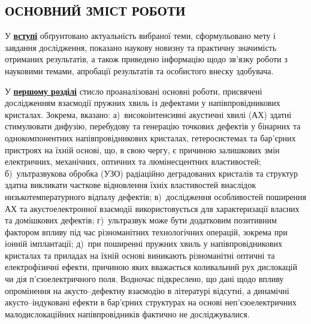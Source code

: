 

\begin{center}
\section*{\MakeUppercase{ОСНОВНИЙ ЗМІСТ РОБОТИ}}
\end{center}

У  \underline{\textbf{вступі}}  обґрунтовано актуальність  вибраної  теми, сформульовано  мету  і
завдання  дослідження, показано  наукову  новизну  та практичну  значимість
отриманих результатів, а також приведено інформацію щодо зв’язку роботи з науковими темами, апробації результатів та
особистого внеску здобувача.


У  \underline{\textbf{першому розділі}}   стисло проаналізовані основні роботи, присвячені
дослідженням взаємодії пружних хвиль із дефектами у напівпровідникових кристалах.
Зокрема,
вказано:
а)~високоінтенсивні акустичні хвилі (АХ) здатні стимулювати дифузію, перебудову та генерацію точкових дефектів у бінарних та однокомпонентних напівпровідникових кристалах, гетеросистемах та бар'єрних пристроях на їхній основі,
що, в свою чергу, є причиною залишкових змін електричних, механічних, оптичних та  люмінесцентних властивостей;
б)~ультразвукова обробка (УЗО) радіаційно деградованих кристалів та структур здатна викликати часткове відновлення їхніх властивостей внаслідок низькотемпературного відпалу дефектів;
в)~дослідження особливостей поширення АХ та акустоелектронної взаємодії використовується для характеризації власних та домішкових дефектів;
г)~ультразвук може бути додатковим позитивним фактором впливу під час різноманітних технологічних операцій, зокрема при іонній імплантації;
д)~при поширенні пружних хвиль у напівпровідникових кристалах та приладах на їхній основі виникають різноманітні оптичні та електрофізичні ефекти, причиною яких вважається коливальний рух дислокацій чи дія п'єзоелектричного поля.
Водночас підкреслено,
що дані щодо впливу опромінення на акусто--дефектну взаємодію в літературі відсутні,
а динамічні акусто--індуковані ефекти в бар'єрних структурах на основі неп'єзоелектричних малодислокаційних напівпровідників фактично не досліджувалися.

